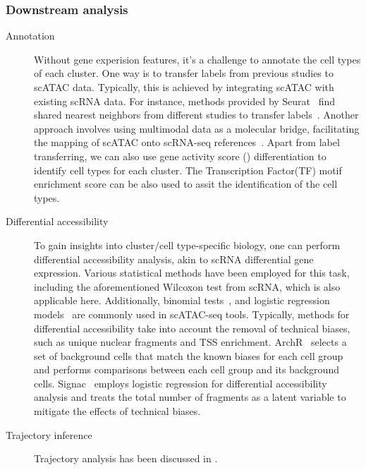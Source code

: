 \subsubsection{Downstream analysis}
\label{background:sec2:atac_downstream}
\begin{description}

	\item[Annotation]
	Without gene experision features, it's a challenge to annotate the cell types of each cluster. One way is to transfer labels from previous studies to scATAC data. Typically, this is achieved by integrating scATAC with existing scRNA data. For instance, methods provided by Seurat~\citep{stuart2019seurat3} find shared nearest neighbors from different studies to transfer labels~\citep{stuart2019seurat3}. Another approach involves using multimodal data as a molecular bridge, facilitating the mapping of scATAC onto scRNA-seq references~\citep{hao2023dictionary}. Apart from label transferring, we can also use gene activity score () differentiation to identify cell types for each cluster. The Transcription Factor(TF) motif enrichment score can be also used to assit the identification of the cell types.

	\item[Differential accessibility]
	To gain insights into cluster/cell type-specific biology, one can perform differential accessibility analysis, akin to scRNA differential gene expression. Various statistical methods have been employed for this task, including the aforementioned Wilcoxon test from scRNA, which is also applicable here. Additionally, binomial tests~\citep{cusanovich2018single}, and logistic regression models~\citep{hao2021seurat4} are commonly used in scATAC-seq tools. Typically, methods for differential accessibility take into account the removal of technical biases, such as unique nuclear fragments and TSS enrichment. ArchR~\citep{Granja2021} selects a set of background cells that match the known biases for each cell group and performs comparisons between each cell group and its background cells. Signac~\citep{hao2021seurat4} employs logistic regression for differential accessibility analysis and treats the total number of fragments as a latent variable to mitigate the effects of technical biases.

	\item[Trajectory inference]
	Trajectory analysis has been discussed in .



\end{description}
